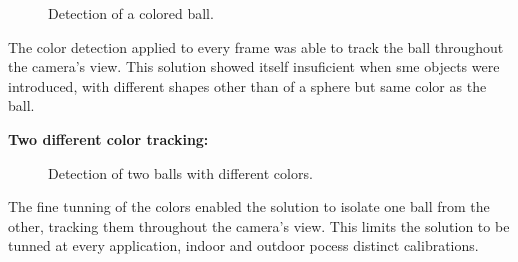 \documentclass[10pt,twocolumn,letterpaper]{article}
\begin{document}
  \begin{figure}[!h]
    \centering
    \setlength{\fboxsep}{1pt}
    \setlength{\fboxrule}{1pt}
    \caption{Detection of a colored ball.}
    \label{fig:single_color}
  \end{figure}

  The color detection applied to every frame was able to track the ball
  throughout the camera's view. This solution showed itself insuficient when
  sme objects were introduced, with different shapes other than of a sphere but
  same color as the ball.

  \bigbreak
  \textbf{Two different color tracking:}
  \bigbreak

  \begin{figure}[!h]
    \centering
    \setlength{\fboxsep}{1pt}
    \setlength{\fboxrule}{1pt}
    \caption{Detection of two balls with different colors.}
    \label{fig:diff_color}
  \end{figure}

  The fine tunning of the colors enabled the solution to isolate one ball from
  the other, tracking them throughout the camera's view. This limits the
  solution to be tunned at every application, indoor  and outdoor pocess
  distinct calibrations.
\end{document}
